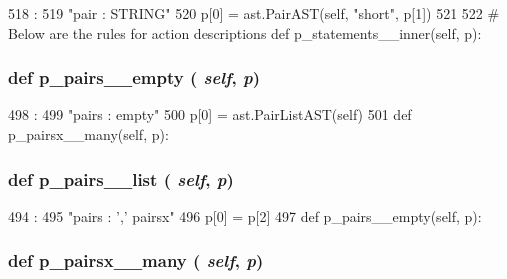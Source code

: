 \begin{DoxyVerb}
\begin{DoxyCode}
518                                 :
519         "pair : STRING"
520         p[0] = ast.PairAST(self, "short", p[1])
521 
522     # Below are the rules for action descriptions
    def p_statements__inner(self, p):
\end{DoxyCode}
\hypertarget{classslicc_1_1parser_1_1SLICC_aec4bd1f627bdee6f671f29365c3391bc}{
\subsubsection[{p\_\-pairs\_\-\_\-empty}]{\setlength{\rightskip}{0pt plus 5cm}def p\_\-pairs\_\-\_\-empty ( {\em self}, \/   {\em p})}}
\label{classslicc_1_1parser_1_1SLICC_aec4bd1f627bdee6f671f29365c3391bc}



\begin{DoxyCode}
498                                :
499         "pairs : empty"
500         p[0] = ast.PairListAST(self)
501 
    def p_pairsx__many(self, p):
\end{DoxyCode}
\hypertarget{classslicc_1_1parser_1_1SLICC_a3fd3d9fd8b7476e2bc528c2844abf9d6}{
\subsubsection[{p\_\-pairs\_\-\_\-list}]{\setlength{\rightskip}{0pt plus 5cm}def p\_\-pairs\_\-\_\-list ( {\em self}, \/   {\em p})}}
\label{classslicc_1_1parser_1_1SLICC_a3fd3d9fd8b7476e2bc528c2844abf9d6}



\begin{DoxyCode}
494                               :
495         "pairs : ',' pairsx"
496         p[0] = p[2]
497 
    def p_pairs__empty(self, p):
\end{DoxyCode}
\hypertarget{classslicc_1_1parser_1_1SLICC_a9ae62ba90c608a64c39c7f20bf4d550f}{
\subsubsection[{p\_\-pairsx\_\-\_\-many}]{\setlength{\rightskip}{0pt plus 5cm}def p\_\-pairsx\_\-\_\-many ( {\em self}, \/   {\em p})}}
\label{classslicc_1_1parser_1_1SLICC_a9ae62ba90c608a64c39c7f20bf4d550f}




\end{DoxyVerb}
